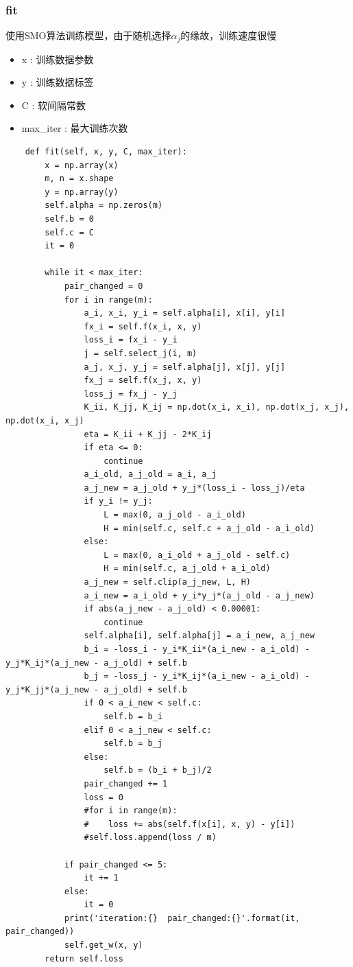 \documentclass[12pt, a4paper, oneside]{ctexart}
\begin{document}
\subsubsection*{fit}
使用SMO算法训练模型，由于随机选择$\alpha_{j}$的缘故，训练速度很慢
\begin{itemize}
    \item x : 训练数据参数
    \item y : 训练数据标签
    \item C : 软间隔常数
    \item max\_iter : 最大训练次数
\end{itemize}
\begin{lstlisting}
    def fit(self, x, y, C, max_iter):
        x = np.array(x)
        m, n = x.shape
        y = np.array(y)
        self.alpha = np.zeros(m)
        self.b = 0
        self.c = C
        it = 0

        while it < max_iter:
            pair_changed = 0
            for i in range(m):
                a_i, x_i, y_i = self.alpha[i], x[i], y[i]
                fx_i = self.f(x_i, x, y)
                loss_i = fx_i - y_i
                j = self.select_j(i, m)
                a_j, x_j, y_j = self.alpha[j], x[j], y[j]
                fx_j = self.f(x_j, x, y)
                loss_j = fx_j - y_j
                K_ii, K_jj, K_ij = np.dot(x_i, x_i), np.dot(x_j, x_j), np.dot(x_i, x_j)
                eta = K_ii + K_jj - 2*K_ij
                if eta <= 0:
                    continue
                a_i_old, a_j_old = a_i, a_j
                a_j_new = a_j_old + y_j*(loss_i - loss_j)/eta
                if y_i != y_j:
                    L = max(0, a_j_old - a_i_old)
                    H = min(self.c, self.c + a_j_old - a_i_old)
                else:
                    L = max(0, a_i_old + a_j_old - self.c)
                    H = min(self.c, a_j_old + a_i_old)
                a_j_new = self.clip(a_j_new, L, H)
                a_i_new = a_i_old + y_i*y_j*(a_j_old - a_j_new)
                if abs(a_j_new - a_j_old) < 0.00001:
                    continue
                self.alpha[i], self.alpha[j] = a_i_new, a_j_new
                b_i = -loss_i - y_i*K_ii*(a_i_new - a_i_old) - y_j*K_ij*(a_j_new - a_j_old) + self.b
                b_j = -loss_j - y_i*K_ij*(a_i_new - a_i_old) - y_j*K_jj*(a_j_new - a_j_old) + self.b
                if 0 < a_i_new < self.c:
                    self.b = b_i
                elif 0 < a_j_new < self.c:
                    self.b = b_j
                else:
                    self.b = (b_i + b_j)/2
                pair_changed += 1
                loss = 0
                #for i in range(m):
                #    loss += abs(self.f(x[i], x, y) - y[i])
                #self.loss.append(loss / m)
                
            if pair_changed <= 5:
                it += 1
            else:
                it = 0
            print('iteration:{}  pair_changed:{}'.format(it, pair_changed))
            self.get_w(x, y)
        return self.loss


\end{lstlisting}
\end{document}
